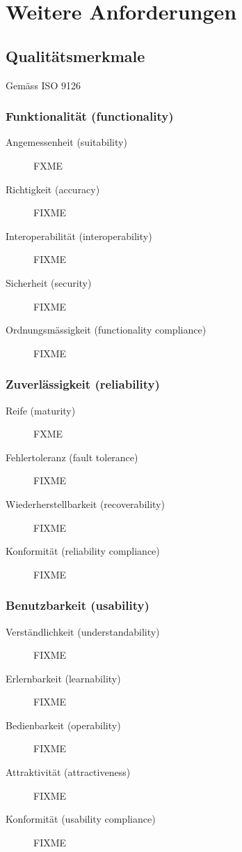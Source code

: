 \documentclass[a4paper]{article}
\let\oldsection\section
\renewcommand\section{\clearpage\oldsection}
\begin{document}
\pagebreak
\section{Weitere Anforderungen}

\subsection{Qualitätsmerkmale}

Gemäss ISO 9126

\subsubsection{Funktionalität (functionality)}

\begin{description}
  \item[Angemessenheit (suitability)]
    FXME
  \item[Richtigkeit (accuracy)]
    FIXME
  \item[Interoperabilität (interoperability)]
    FIXME
  \item[Sicherheit (security)]
    FIXME
  \item[Ordnungsmässigkeit (functionality compliance)]
    FIXME
\end{description}

\subsubsection{Zuverlässigkeit (reliability)}

\begin{description}
  \item[Reife (maturity)]
    FXME
  \item[Fehlertoleranz (fault tolerance)]
    FIXME
  \item[Wiederherstellbarkeit (recoverability)]
    FIXME
  \item[Konformität (reliability compliance)]
    FIXME
\end{description}

\subsubsection{Benutzbarkeit (usability)}

\begin{description}
  \item[Verständlichkeit (understandability)]
    FIXME
  \item[Erlernbarkeit (learnability)]
    FIXME
  \item[Bedienbarkeit (operability)]
    FIXME
  \item[Attraktivität (attractiveness)]
    FIXME
  \item[Konformität (usability compliance)]
    FIXME
\end{description}
\end{document}
